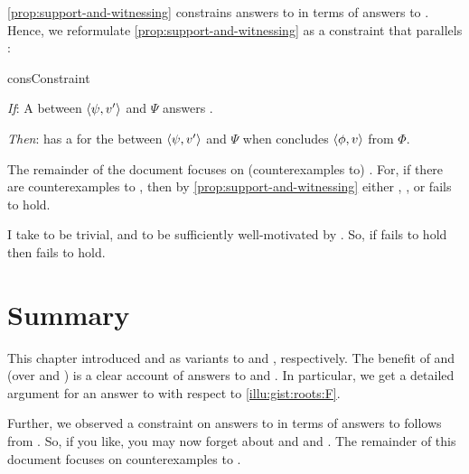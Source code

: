 



\begin{note}
  \autoref{prop:support-and-witnessing} constrains answers to \qWhyV{} in terms of answers to \qHowV{}.
  Hence, we reformulate \autoref{prop:support-and-witnessing} as a constraint that parallels \issueInclusion{}:

  \begin{constraint}{consConstraint}{\issueConstraint{}}
    \vspace{-\baselineskip}
    \begin{itenum}
    \item[\emph{If}:]
      A \ros{} between \(\langle\psi, v'\rangle\) and \(\Psi\) answers \qWhyV{}.
    \item[\emph{Then}:]
      \vAgent{} has a \wit{} for the \ros{} between \(\langle\psi, v'\rangle\) and \(\Psi\) when \vAgent{} concludes \(\langle\phi, v\rangle\) from \(\Phi\).
    \end{itenum}
    \vspace{-\baselineskip}
  \end{constraint}

  \noindent%
  The remainder of the document focuses on (counterexamples to) \issueConstraint{}.
  For, if there are counterexamples to \issueConstraint{}, then by \autoref{prop:support-and-witnessing} either \linkW{}, \linkH{}, or \issueInclusion{} fails to hold.

  I take \linkH{} to be trivial, and \linkW{} to be sufficiently well-motivated by \progEx{}.
  So, if \issueConstraint{} fails to hold then \issueInclusion{} fails to hold.
\end{note}



\section*{Summary}

\begin{note}
  This chapter introduced \qWhyV{} and \qHowV{} as variants to \qWhy{} and \qHow{}, respectively.
  The benefit of \qWhyV{} and \qHowV{} (over \qWhy{} and \qHow{}) is a clear account of answers to \qWhyV{} and \qHowV{}.
  In particular, we get a detailed argument for an answer to \qWhyV{} with respect to \autoref{illu:gist:roots:F}.

  Further, we observed a constraint on answers to \qWhyV{} in terms of answers to \qHowV{} follows from \issueInclusion{}.
  So, if you like, you may now forget about \qWhy{} and \qHow{} and \issueInclusion{}.
  The remainder of this document focuses on counterexamples to \issueConstraint{}.
\end{note}


